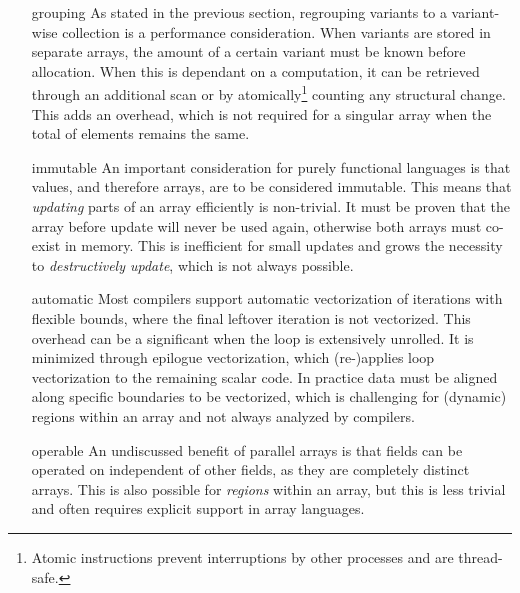 \documentclass{article}
\begin{document}
\begin{itemize}
    \item [grouping]
    As stated in the previous section, regrouping variants to a variant-wise collection is a performance consideration.
    When variants are stored in separate arrays, the amount of a certain variant must be known before allocation.
    When this is dependant on a computation, it can be retrieved through an additional scan or by atomically\footnote{Atomic instructions prevent interruptions by other processes and are thread-safe.} counting any structural change.
    This adds an overhead, which is not required for a singular array when the total of elements remains the same.

    \item [immutable]
    An important consideration for purely functional languages is that values, and therefore arrays, are to be considered immutable.
    This means that {\it{updating}} parts of an array efficiently is non-trivial.
    It must be proven that the array before update will never be used again, otherwise both arrays must co-exist in memory.
    This is inefficient for small updates and grows the necessity to {\it destructively update}\cite{destructive-update-array}, which is not always possible.

    \item[automatic]
    Most compilers support automatic vectorization of iterations with flexible bounds, where the final leftover iteration is not vectorized.  
    This overhead can be a significant when the loop is extensively unrolled.
    It is minimized through epilogue vectorization, which (re-)applies loop vectorization to the remaining scalar code.
    In practice data must be aligned along specific boundaries to be vectorized, which is challenging for (dynamic) regions within an array and not always analyzed by compilers\cite{automatic-vectorization}.

    \item [operable]
    An undiscussed benefit of parallel arrays is that fields can be operated on independent of other fields, as they are completely distinct arrays.
    This is also possible for {\it regions} within an array, but this is less trivial and often requires explicit support in array languages\cite{accelerate-independent-regions}. 
\end{itemize}
\end{document}
